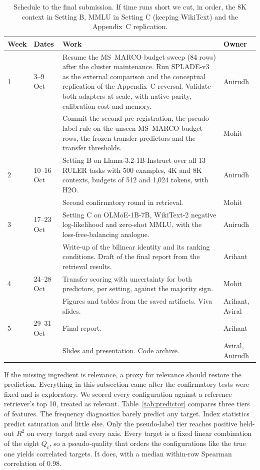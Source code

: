 \documentclass[11pt]{article}
\begin{document}
\begin{table}[t]
\centering
\small
\begin{tabular}{@{}llp{}l@{}}
\toprule
Week & Dates & Work & Owner \\
\midrule
1 & 3--9 Oct & Resume the MS~MARCO budget sweep (84 rows) after the cluster maintenance. Run
SPLADE-v3 as the external comparison and the conceptual replication of the Appendix~C
reversal. Validate both adapters at scale, with native parity, calibration cost and memory.
& Anirudh \\
 & & Commit the second pre-registration, the pseudo-label rule on the unseen MS~MARCO budget
rows, the frozen transfer predictors and the transfer thresholds. & Mohit \\
2 & 10--16 Oct & Setting B on Llama-3.2-1B-Instruct over all 13 RULER tasks with 500
examples, 4K and 8K contexts, budgets of 512 and 1{,}024 tokens, with H2O. & Anirudh \\
 & & Second confirmatory round in retrieval. & Mohit \\
3 & 17--23 Oct & Setting C on OLMoE-1B-7B, WikiText-2 negative log-likelihood and zero-shot
MMLU, with the loss-free-balancing analogue. & Anirudh \\
 & & Write-up of the bilinear identity and its ranking conditions. Draft of the final report
from the retrieval results. & Arihant \\
4 & 24--28 Oct & Transfer scoring with uncertainty for both predictors, per setting, against
the majority sign. & Mohit \\
 & & Figures and tables from the saved artifacts. Viva slides. & Arihant, Aviral \\
5 & 29--31 Oct & Final report. & Arihant \\
 & & Slides and presentation. Code archive. & Aviral, Anirudh \\
\bottomrule
\end{tabular}
\caption{Schedule to the final submission. If time runs short we cut, in order, the 8K context in Setting B, MMLU in Setting C (keeping WikiText)
and the Appendix~C replication.}
\label{tab:plan}
\end{table}

If the missing ingredient is relevance, a proxy for relevance should restore the
prediction. Everything in this subsection came after the confirmatory tests were fixed
and is exploratory. We scored every configuration against a reference retriever's top 10,
treated as relevant. Table~\ref{tab:predictor} compares three tiers of features. The
frequency diagnostics barely predict any target. Index statistics predict saturation and
little else. Only the pseudo-label tier reaches positive held-out $R^2$ on every target
and every axis. Every target is a fixed linear combination of the
eight $Q_c$, so a pseudo-quality that orders the configurations like the true one yields
correlated targets. It does, with a median within-row Spearman correlation of $0.98$.
\end{document}
